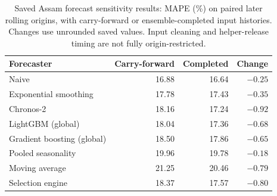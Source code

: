 \begin{table}[tbp]
\caption{Saved Assam forecast sensitivity results: MAPE (\%) on paired later rolling origins, with carry-forward or ensemble-completed input histories. Changes use unrounded saved values. Input cleaning and helper-release timing are not fully origin-restricted.}
\label{tab:downstream}
\small
\setlength{\tabcolsep}{4pt}
\begin{tabular}{lrrr}
\toprule
Forecaster & Carry-forward & Completed & Change \\
\midrule
Naive & 16.88 & 16.64 & $-0.25$ \\
Exponential smoothing & 17.78 & 17.43 & $-0.35$ \\
Chronos-2 & 18.16 & 17.24 & $-0.92$ \\
LightGBM (global) & 18.04 & 17.36 & $-0.68$ \\
Gradient boosting (global) & 18.50 & 17.86 & $-0.65$ \\
Pooled seasonality & 19.96 & 19.78 & $-0.18$ \\
Moving average & 21.25 & 20.46 & $-0.79$ \\
Selection engine & 18.37 & 17.57 & $-0.80$ \\
\bottomrule
\end{tabular}
\end{table}
